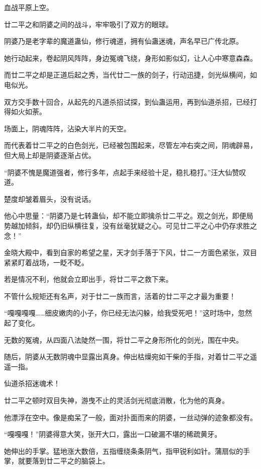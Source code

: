 
\begin{this_body}

血战平原上空。

廿二平之和阴婆之间的战斗，牢牢吸引了双方的眼球。

阴婆乃是老字辈的魔道蛊仙，修行魂道，拥有仙蛊迷魂，声名早已广传北原。

她行动起来，卷起阴风阵阵，身边冤魂飞绕，身形如影似幻，让人心中寒意森森。

而廿二平之却是正道后起之秀，当代廿二一族的剑子，行动迅捷，剑光纵横间，如电似光。

双方交手数十回合，从起先的凡道杀招试探，到仙蛊运用，再到仙道杀招，已经打得如火如荼。

场面上，阴魂阵阵，沾染大半片的天空。

而代表着廿二平之的白色剑光，已经被包围起来，尽管左冲右突之间，阴魂辟易，但大局上却是阴婆逐渐占优。

“阴婆不愧是魔道强者，修行多年，点起手来经验十足，稳扎稳打。”汪大仙赞叹道。

楚度却皱着眉头，没有说话。

他心中思量：“阴婆乃是七转蛊仙，却不能立即擒杀廿二平之。观之剑光，即便局势越加倾斜，却仍旧纵横往复，没有丝毫犹疑之心。可见廿二平之心中仍存求胜之念！”

金晓大殿中，看到自家的希望之星，天才剑手落于下风，廿二一方面色紧张，双目紧紧盯着战场，一眨不眨。

若是情况不利，他就会立即出手，将廿二平之救下来。

不管什么规矩还有名声，对于廿二一族而言，活着的廿二平之才最为重要！

“嘎嘎嘎嘎……细皮嫩肉的小子，你已经无法闪躲，给我受死吧！”这时场中，忽然起了变化。

无数的冤魂，从四面八法陡然一围，将廿二平之身形所化的剑光，围在中央。

随后，阴婆从无数阴魂中显露出真身。伸出枯燥宛如干柴的手指，对着廿二平之遥遥一指。

仙道杀招迷魂术！

廿二平之顿时双目失神，游曳不止的灵活剑光彻底消散，化为他的真身。

他漂浮在空中。像是痴呆了一般，面对扑面而来的阴婆，一丝动弹的迹象都没有。

“嘎嘎嘎！”阴婆得意大笑，张开大口，露出一口破漏不堪的稀疏黄牙。

她伸出的手掌。猛地涨大数倍，五指缠绕条条阴气，指甲锐利如针。蒲扇似的手掌，就要落到廿二平之的脑袋上。


\end{this_body}

